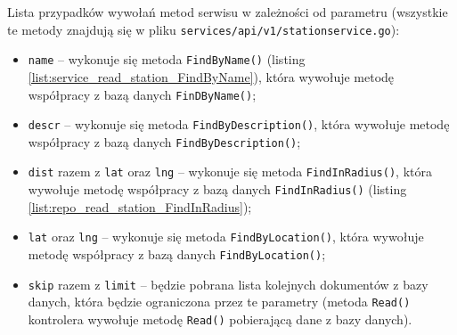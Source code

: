 Lista przypadków wywołań metod serwisu w zależności od parametru (wszystkie te metody znajdują się w pliku \texttt{services/api/v1/stationservice.go}):
\begin{itemize}
    \item \texttt{name} -- wykonuje się metoda \texttt{FindByName()} (listing \ref{list:service_read_station_FindByName}), która wywołuje metodę współpracy z bazą danych \texttt{FinDByName()};
    \item \texttt{descr} -- wykonuje się metoda \texttt{FindByDescription()}, która wywołuje metodę współpracy z bazą danych \texttt{FindByDescription()};
    \item \texttt{dist} razem z \texttt{lat} oraz \texttt{lng} -- wykonuje się metoda \texttt{FindInRadius()}, która wywołuje metodę współpracy z bazą danych \texttt{FindInRadius()} (listing \ref{list:repo_read_station_FindInRadius});
    \item \texttt{lat} oraz \texttt{lng} -- wykonuje się metoda \texttt{FindByLocation()}, która wywołuje metodę współpracy z bazą danych \texttt{FindByLocation()};
    \item \texttt{skip} razem z \texttt{limit} -- będzie pobrana lista kolejnych dokumentów z bazy danych, która będzie ograniczona przez te parametry (metoda \texttt{Read()} kontrolera wywołuje metodę \texttt{Read()} pobierającą dane z bazy danych).
\end{itemize}

